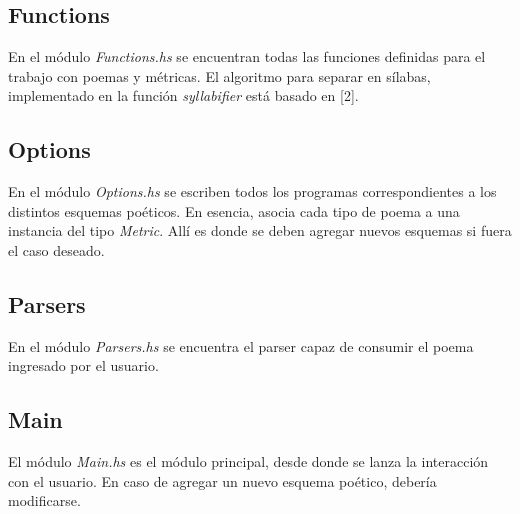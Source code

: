 \documentclass[12pt, a4paper]{article}
\begin{document}
\subsection*{Functions}
En el módulo \textit{Functions.hs} se encuentran todas las funciones definidas para el trabajo con poemas y métricas. El algoritmo para separar en sílabas, implementado en la función \textit{syllabifier} está basado en [2].
\subsection*{Options}
En el módulo \textit{Options.hs} se escriben todos los programas correspondientes a los distintos esquemas poéticos. En esencia, asocia cada tipo de poema a una instancia del tipo \textit{Metric}. Allí es donde se deben agregar nuevos esquemas si fuera el caso deseado. 
\subsection*{Parsers}
En el módulo \textit{Parsers.hs} se encuentra el parser capaz de consumir el poema ingresado por el usuario.
\subsection*{Main}
El módulo \textit{Main.hs} es el módulo principal, desde donde se lanza la interacción con el usuario. En caso de agregar un nuevo esquema poético, debería modificarse.
\end{document}
